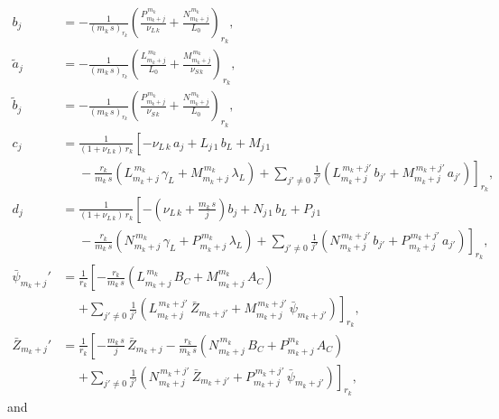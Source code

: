 \documentclass[12pt,prb,aps]{revtex4-1}
\begin{document}
\begin{align}
b_j&=- \frac{1}{(m_k\,s)_{r_k}}\left(\frac{P^{\,m_k}_{m_k+j}}{\nu_{L\,k}}+\frac{N^{\,m_k}_{m_k+j}}{L_0}\right)_{r_k},\\[0.5ex]
\tilde{a}_{j}&= -\frac{1}{(m_k\,s)_{r_k}}\left(\frac{L^{\,m_k}_{m_k+j}}{L_0}+\frac{M^{\,m_k}_{m_k+j}}{\nu_{S\,k}}\right)_{r_k},\\[0.5ex]
\tilde{b}_{j}&=- \frac{1}{(m_k\,s)_{r_k}}\left(\frac{P^{\,m_k}_{m_k+j}}{\nu_{S\,k}}+\frac{N^{\,m_k}_{m_k+j}}{L_0}\right)_{r_k},\label{e138}\\[0.5ex]
c_j&= \frac{1}{(1+\nu_{L\,k})\,r_k}\left[-\nu_{L\,k}\,a_j+L_{j\,1}\,b_{L}+M_{j\,1}\phantom{\frac{1}{j}}\right.\nonumber\\[0.5ex]
&\phantom{=}-
\frac{r_k}{m_k\,s}\left(L_{m_k+j}^{\,m_k}\,\gamma_L+M_{m_k+j}^{\,m_k}\,\lambda_L\right) +\left.\sum_{j'\neq 0} \frac{1}{j'}\left(L_{m_k+j}^{\,m_k+j'}\,b_{j'}+ M_{m_k+j}^{\,m_k+j'}\,a_{j'}\right)\right]_{r_k},\\[0.5ex]
d_j&= \frac{1}{(1+\nu_{L\,k})\,r_k}\left[-\left(\nu_{L\,k}+\frac{m_k\,s}{j}\right)b_j+N_{j\,1}\,b_{L}+P_{j\,1}\right.\nonumber\\[0.5ex]
&\phantom{=}-
\frac{r_k}{m_k\,s}\left(N_{m_k+j}^{\,m_k}\,\gamma_L+P_{m_k+j}^{\,m_k}\,\lambda_L\right) +\left.\sum_{j'\neq 0} \frac{1}{j'}\left(N_{m_k+j}^{\,m_k+j'}\,b_{j'}+ P_{m_k+j}^{\,m_k+j'}\,a_{j'}\right)\right]_{r_k},\\[0.5ex]
\bar{\psi}_{m_k+j}' &= \frac{1}{r_k}\left[-\frac{r_k}{m_k\,s}\left(L_{m_k+j}^{\,m_k}\,B_C+ M_{m_k+j}^{m_k}\,A_C\right)\right.\nonumber\\[0.5ex]&\phantom{=}\left.
+ \sum_{j'\neq 0} \frac{1}{j'}\left(L_{m_k+j}^{\,m_k+j'}\,\bar{Z}_{m_k+j'} +M_{m_k+j}^{\,m_k+j'}\,\bar{\psi}_{m_k+j'}\right)\right]_{r_k},\\[0.5ex]
\bar{Z}_{m_k+j}' &= \frac{1}{r_k}\left[-\frac{m_k\,s}{j}\,\bar{Z}_{m_k+j}-\frac{r_k}{m_k\,s}\left(N_{m_k+j}^{\,m_k}\,B_C+ P_{m_k+j}^{m_k}\,A_C\right)\right.\nonumber\\[0.5ex]&\phantom{=}\left.+ 
\sum_{j'\neq 0} \frac{1}{j'}\left(N_{m_k+j}^{\,m_k+j'}\,\bar{Z}_{m_k+j'} +P_{m_k+j}^{\,m_k+j'}\,\bar{\psi}_{m_k+j'}\right)\right]_{r_k},
\end{align}
and
\end{document}
